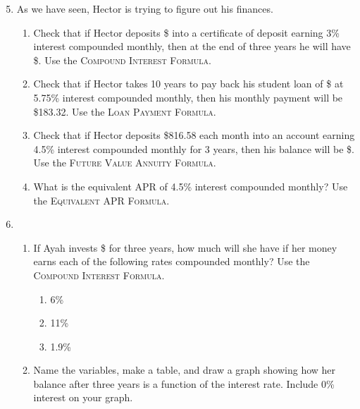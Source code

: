 \begin{enumerate} 
\setcounter{enumi}{4}

\item As we have seen, Hector is trying to figure out his finances.  
\begin{enumerate}
\item Check that if Hector deposits \$ into a certificate of deposit earning 3\% interest compounded monthly, then at the end of three years he will have \$.  Use the \textsc{Compound Interest Formula}.
\item Check that if Hector takes 10 years to pay back his student loan of \$ at 5.75\% interest compounded monthly, then his monthly payment will be  \$183.32.  Use the \textsc{Loan Payment Formula}.
\item Check that if Hector deposits \$816.58 each month into an account earning 4.5\% interest compounded monthly for 3 years, then his balance will be \$.  Use the \textsc{Future Value Annuity Formula}.
\item What is the equivalent APR of 4.5\% interest compounded monthly?  Use the \textsc{Equivalent APR Formula}.
\end{enumerate}

\item \begin{enumerate}
\item If Ayah invests \$ for three years, how much will she have if her money earns each of the following rates compounded monthly? Use the \textsc{Compound Interest Formula}.
\begin{multicols}{4}
\begin{enumerate}
\item 6\%
\item 11\%
\item 1.9\%
\end{enumerate}
\end{multicols}
\item Name the variables, make a table, and draw a graph showing how her balance after three years is a function of the interest rate.  Include 0\% interest on your graph.
\end{enumerate}


\end{enumerate}
